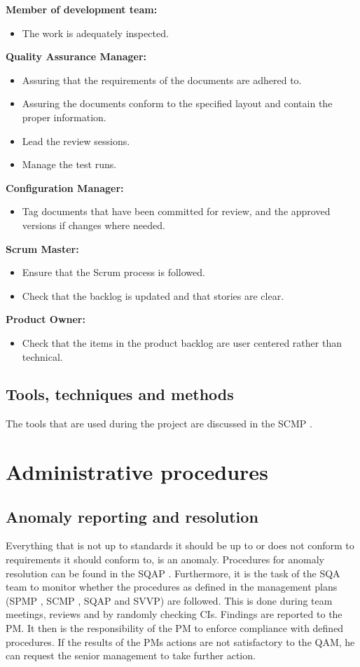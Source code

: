 \documentclass[%
		pathtobase=..,%
		titlefull={Software Validation and Verification Plan},%
		titleabbr=SVVP,%
		version=0.1]{fingerpaint}
\begin{document}
\textbf{Member of development team:}
\begin{itemize}
\item The work is adequately inspected.
\end{itemize}

\textbf{Quality Assurance Manager:}
\begin{itemize}
\item Assuring that the requirements of the documents are adhered to.
\item Assuring the documents conform to the specified layout and contain the proper information.
\item Lead the review sessions.
\item Manage the test runs.
\end{itemize}

\textbf{Configuration Manager:}
\begin{itemize}
\item Tag documents that have been committed for review, and the approved versions if changes where needed.
\end{itemize}

\textbf{Scrum Master:}
\begin{itemize}
\item Ensure that the Scrum process is followed.
\item Check that the backlog is updated and that stories are clear.
\end{itemize}

\textbf{Product Owner:}
\begin{itemize}
\item Check that the items in the product backlog are user centered rather than technical.
\end{itemize}


\section{Tools, techniques and methods}
The tools that are used during the project are discussed in the SCMP \cite{scmp}.
\chapter{Administrative procedures}
\section{Anomaly reporting and resolution}
Everything that is not up to standards it should be up to or does not conform to requirements it should conform to, is an anomaly. Procedures for anomaly resolution can be found in the SQAP \cite{sqap}. Furthermore, it is the task of the SQA team to monitor whether the procedures as defined in the management plans (SPMP \cite{spmp}, SCMP \cite{scmp}, SQAP \cite{sqap} and SVVP) are followed. This is done during team meetings, reviews and by randomly checking CIs. Findings are reported to the PM. It then is the responsibility of the PM to enforce compliance with defined procedures. If the results of the PMs actions are not satisfactory to the QAM, he can request the senior management to take further action.
\end{document}

